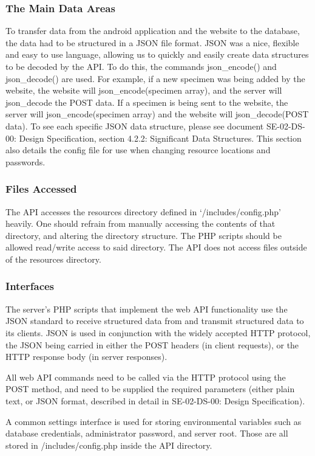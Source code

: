     \subsubsection{The Main Data Areas}
        To transfer data from the android application and the website to the database,  the data had to be structured in a JSON file format. JSON was a nice, flexible and easy to use language, allowing us to quickly and easily create data structures to be decoded by the API. To do this, the commands json\_encode() and json\_decode() are used. For example, if a new specimen was being added by the website, the website will json\_encode(specimen array), and the server will json\_decode the POST data. If a specimen is being sent to the website, the server will json\_encode(specimen array) and the website will json\_decode(POST data). To see each specific JSON data structure, please see document SE-02-DS-00: Design Specification, section 4.2.2: Significant Data Structures. This section also details the config file for use when changing resource locations and passwords. 

    \subsubsection{Files Accessed}
        The API accesses the resources directory defined in `/includes/config.php' heavily. One should refrain from manually accessing the contents of that directory, and altering the directory structure. The PHP scripts should be allowed read/write access to said directory. The API does not access files outside of the resources directory.

    \subsubsection{Interfaces}
        The server's PHP scripts that implement the web API functionality use the JSON standard to receive structured data from and transmit structured data to its clients. JSON is used in conjunction with the widely accepted HTTP protocol, the JSON being carried in either the POST headers (in client requests), or the HTTP response body (in server responses).
    
        All web API commands need to be called via the HTTP protocol using the POST method, and need to be supplied the required parameters (either plain text, or JSON format, described in detail in SE-02-DS-00: Design Specification).
        
        A common settings interface is used for storing environmental variables such as database credentials, administrator password, and server root. Those are all stored in /includes/config.php inside the API directory.

